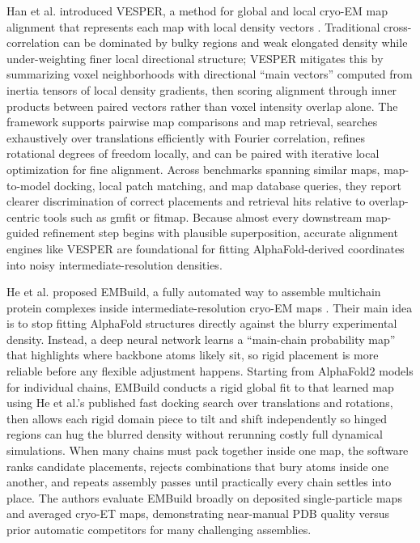 \documentclass[12pt]{article}
\begin{document}
Han et al. introduced VESPER, a method for global and local cryo-EM map alignment that represents each map with local density vectors \cite{han2021vesper}. Traditional cross-correlation can be dominated by bulky regions and weak elongated density while under-weighting finer local directional structure; VESPER mitigates this by summarizing voxel neighborhoods with directional ``main vectors'' computed from inertia tensors of local density gradients, then scoring alignment through inner products between paired vectors rather than voxel intensity overlap alone. The framework supports pairwise map comparisons and map retrieval, searches exhaustively over translations efficiently with Fourier correlation, refines rotational degrees of freedom locally, and can be paired with iterative local optimization for fine alignment. Across benchmarks spanning similar maps, map-to-model docking, local patch matching, and map database queries, they report clearer discrimination of correct placements and retrieval hits relative to overlap-centric tools such as gmfit or fitmap. Because almost every downstream map-guided refinement step begins with plausible superposition, accurate alignment engines like VESPER are foundational for fitting AlphaFold-derived coordinates into noisy intermediate-resolution densities.


He et al. proposed EMBuild, a fully automated way to assemble multichain protein complexes inside intermediate-resolution cryo-EM maps \cite{he2022embuild}. Their main idea is to stop fitting AlphaFold structures directly against the blurry experimental density. Instead, a deep neural network learns a ``main-chain probability map'' that highlights where backbone atoms likely sit, so rigid placement is more reliable before any flexible adjustment happens. Starting from AlphaFold2 models for individual chains, EMBuild conducts a rigid global fit to that learned map using He et al.'s published fast docking search over translations and rotations, then allows each rigid domain piece to tilt and shift independently so hinged regions can hug the blurred density without rerunning costly full dynamical simulations. When many chains must pack together inside one map, the software ranks candidate placements, rejects combinations that bury atoms inside one another, and repeats assembly passes until practically every chain settles into place. The authors evaluate EMBuild broadly on deposited single-particle maps and averaged cryo-ET maps, demonstrating near-manual PDB quality versus prior automatic competitors for many challenging assemblies.
\end{document}
